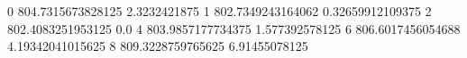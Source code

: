 0 804.7315673828125 2.3232421875
1 802.7349243164062 0.32659912109375
2 802.4083251953125 0.0
4 803.9857177734375 1.577392578125
6 806.6017456054688 4.19342041015625
8 809.3228759765625 6.91455078125
